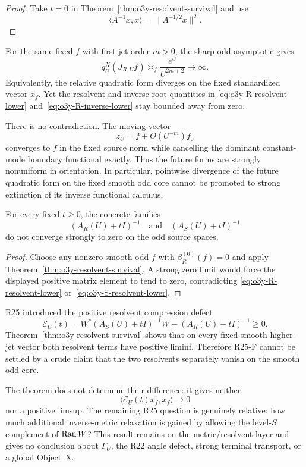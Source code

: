\begin{proof}
Take $t=0$ in Theorem~\ref{thm:o3y-resolvent-survival} and use
\[
 \langle A^{-1}x,x\rangle=\|A^{-1/2}x\|^2.
\]
\end{proof}

\begin{remark}
\label{rem:o3y-nonuniformity}
For the same fixed $f$ with first jet order $m>0$, the sharp odd asymptotic gives
\[
 q_U^X(J_{R,U}f)
 \asymp_f\frac{e^U}{U^{2m+2}}
 \longrightarrow\infty.
\]
Equivalently, the relative quadratic form diverges on the fixed standardized vector
$x_f$.  Yet the resolvent and inverse-root quantities in
\eqref{eq:o3y-R-resolvent-lower} and~\eqref{eq:o3y-R-inverse-lower} stay bounded away
from zero.

There is no contradiction.  The moving vector
\[
 z_U=f+O(U^{-m})f_0
\]
converges to $f$ in the fixed source norm while cancelling the dominant constant-mode
boundary functional exactly.  Thus the future forms are strongly nonuniform in
orientation.  In particular, pointwise divergence of the future quadratic form on the
fixed smooth odd core cannot be promoted to strong extinction of its inverse functional
calculus.
\end{remark}

\begin{corollary}
\label{cor:o3y-no-extinction}
For every fixed $t\ge0$, the concrete families
\[
 (A_R(U)+tI)^{-1}
 \quad\text{and}\quad
 (A_S(U)+tI)^{-1}
\]
do not converge strongly to zero on the odd source spaces.
\end{corollary}

\begin{proof}
Choose any nonzero smooth odd $f$ with $\beta_R^{(0)}(f)=0$ and apply
Theorem~\ref{thm:o3y-resolvent-survival}.  A strong zero limit would force the displayed
positive matrix element to tend to zero, contradicting
\eqref{eq:o3y-R-resolvent-lower} or~\eqref{eq:o3y-S-resolvent-lower}.
\end{proof}

\begin{remark}
\label{rem:o3y-firewall}
R25 introduced the positive resolvent compression defect
\[
 \mathscr E_U(t)
 =W^*(A_S(U)+tI)^{-1}W-(A_R(U)+tI)^{-1}\ge0.
\]
Theorem~\ref{thm:o3y-resolvent-survival} shows that on every fixed smooth higher-jet
vector both resolvent terms have positive liminf.  Therefore R25-F cannot be settled by
a crude claim that the two resolvents separately vanish on the smooth odd core.

The theorem does not determine their difference: it gives neither
\[
 \langle\mathscr E_U(t)x_f,x_f\rangle\to0
\]
nor a positive limsup.  The remaining R25 question is genuinely relative: how much
additional inverse-metric relaxation is gained by allowing the level-$S$ complement of
$\operatorname{Ran} W$?  This result remains on the metric/resolvent layer and gives no conclusion
about $\Gamma_U$, the R22 angle defect, strong terminal transport, or a global
Object~X.
\end{remark}
